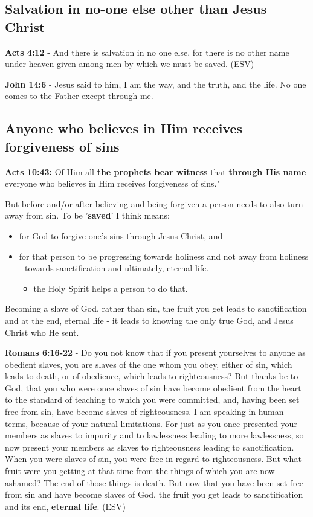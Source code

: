 \documentclass[11pt]{article}
\begin{document}
\subsection{Salvation in no-one else other than Jesus Christ}
\label{sec:org5df6929}
\textbf{Acts 4:12} - And there is salvation in no one else, for there is no other name under heaven given among men by which we must be saved. (ESV)

\textbf{John 14:6} - Jesus said to him, I am the way, and the truth, and the life. No one comes to the Father except through me.

\subsection{Anyone who believes in Him receives forgiveness of sins}
\label{sec:orgcfb2b70}
\textbf{Acts 10:43:} Of Him all \textbf{the prophets bear witness} that \textbf{through His name} everyone who believes in Him receives forgiveness of sins."

But before and/or after believing and being forgiven a person needs to also turn away from sin.
To be '\textbf{saved}' I think means:
\begin{itemize}
\item for God to forgive one's sins through Jesus Christ, and
\item for that person to be progressing towards holiness and not away from holiness - towards sanctification and ultimately, eternal life.
\begin{itemize}
\item the Holy Spirit helps a person to do that.
\end{itemize}
\end{itemize}

Becoming a slave of God, rather than sin, the fruit you get leads to sanctification and at the end, eternal life - it leads to knowing the only true God, and Jesus Christ who He sent.

\textbf{Romans 6:16-22} - Do you not know that if you present yourselves to anyone as obedient slaves, you are slaves of the one whom you obey, either of sin, which leads to death, or of obedience, which leads to righteousness? But thanks be to God, that you who were once slaves of sin have become obedient from the heart to the standard of teaching to which you were committed, and, having been set free from sin, have become slaves of righteousness. I am speaking in human terms, because of your natural limitations. For just as you once presented your members as slaves to impurity and to lawlessness leading to more lawlessness, so now present your members as slaves to righteousness leading to sanctification. When you were slaves of sin, you were free in regard to righteousness. But what fruit were you getting at that time from the things of which you are now ashamed? The end of those things is death. But now that you have been set free from sin and have become slaves of God, the fruit you get leads to sanctification and its end, \textbf{eternal life}. (ESV)
\end{document}
